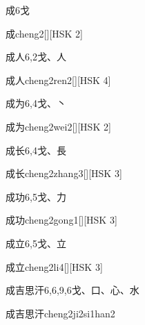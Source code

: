 \begin{entry}{成}{6}{⼽}
  \begin{phonetics}{成}{cheng2}[][HSK 2]
  \end{phonetics}
\end{entry}

\begin{entry}{成人}{6,2}{⼽、⼈}
  \begin{phonetics}{成人}{cheng2ren2}[][HSK 4]
  \end{phonetics}
\end{entry}

\begin{entry}{成为}{6,4}{⼽、⼂}
  \begin{phonetics}{成为}{cheng2wei2}[][HSK 2]
  \end{phonetics}
\end{entry}

\begin{entry}{成长}{6,4}{⼽、⾧}
  \begin{phonetics}{成长}{cheng2zhang3}[][HSK 3]
  \end{phonetics}
\end{entry}

\begin{entry}{成功}{6,5}{⼽、⼒}
  \begin{phonetics}{成功}{cheng2gong1}[][HSK 3]
  \end{phonetics}
\end{entry}

\begin{entry}{成立}{6,5}{⼽、⽴}
  \begin{phonetics}{成立}{cheng2li4}[][HSK 3]
  \end{phonetics}
\end{entry}

\begin{entry}{成吉思汗}{6,6,9,6}{⼽、⼝、⼼、⽔}
  \begin{phonetics}{成吉思汗}{cheng2ji2si1han2}
  \end{phonetics}
\end{entry}

